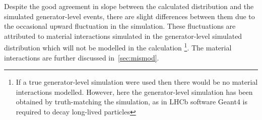 Despite the good agreement in slope between the calculated distribution and the simulated generator-level events, there are slight differences between them due to the occasional upward fluctuation in the simulation. These fluctuations are attributed to material interactions simulated in the generator-level simulated distribution which will not be modelled in the calculation \footnote{If a true generator-level simulation were used then there would be no material interactions modelled. However, here the generator-level simulation has been obtained by truth-matching the simulation, as in LHCb software Geant4 is required to decay long-lived particles}. The material interactions are further discussed in~\autoref{sec:mismod}. %






    
  



